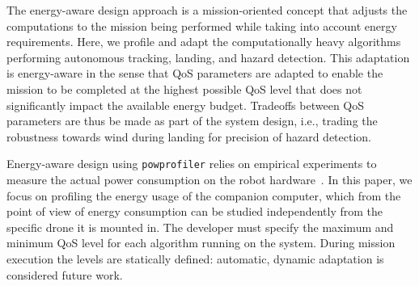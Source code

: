 \documentclass[conference]{IEEEtran}
\newcommand{\stt}[1]{{\small\tt #1}} %
\newcommand{\powprof}{\stt{powprofiler}}
\begin{document}
The energy-aware design approach is a mission-oriented concept that adjusts
the computations to the mission being performed while taking into
account energy requirements. %
Here, we profile and adapt the
computationally heavy algorithms performing autonomous tracking,
landing, and hazard detection. This adaptation is energy-aware
in the sense that QoS parameters are adapted
to enable the mission to be completed at the highest possible QoS
level that does not significantly impact the available energy budget. Tradeoffs
between QoS parameters are thus be made as part of the system design, i.e., trading
the robustness towards wind during landing for precision of hazard
detection.

Energy-aware design using \powprof{} relies on empirical
experiments to measure the actual power consumption on the robot
hardware~\cite{seewald2019coarse}.
%
In this paper, we focus on 
profiling the energy usage of the companion computer,
which from the point of view of energy consumption
can be studied independently from the specific drone it is mounted in.
%
The developer must specify the maximum and minimum QoS level for
each algorithm running on the system.  During mission execution the
levels are statically defined: automatic, dynamic adaptation %
is 
considered future work.
\end{document}
